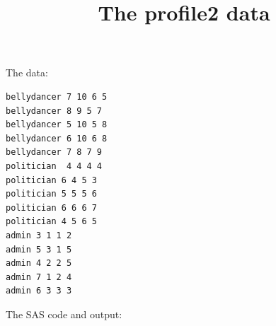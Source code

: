 \documentclass{article}
\title{The profile2 data}
\begin{document}
\maketitle
The data:
\begin{verbatim}
bellydancer 7 10 6 5 
bellydancer 8 9 5 7 
bellydancer 5 10 5 8 
bellydancer 6 10 6 8 
bellydancer 7 8 7 9 
politician  4 4 4 4 
politician 6 4 5 3 
politician 5 5 5 6  
politician 6 6 6 7  
politician 4 5 6 5 
admin 3 1 1 2 
admin 5 3 1 5 
admin 4 2 2 5 
admin 7 1 2 4 
admin 6 3 3 3 
\end{verbatim}
The SAS code and output:
\end{document}
